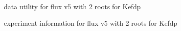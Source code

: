 \documentclass[10pt]{article}
\begin{document}
	\begin{figure}[!tbhp]
		\caption{data utility for flux v5 with 2 roots for Kefdp}
	\end{figure}

	\begin{figure}[!tbhp]
		\caption{experiment information for flux v5 with 2 roots for Kefdp}
	\end{figure}
	
\end{document}
